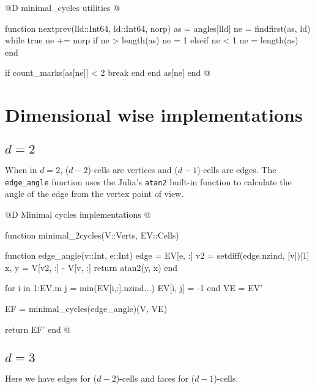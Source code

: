@D minimal\_cycles utilities
@{function nextprev(lld::Int64, ld::Int64, norp)
    as = angles[lld]
    ne = findfirst(as, ld)
    while true
        ne += norp
        if ne > length(as)
            ne = 1
        elseif ne < 1
            ne = length(as)
        end

        if count_marks[as[ne]] < 2
            break
        end
    end
    as[ne]
end
@}



\section{Dimensional wise implementations}
\label{sec:angles_fn}

\subsection{$d=2$}

When in $d=2$, ($d-2$)-cells are vertices and ($d-1$)-cells are edges.
The \texttt{edge\_angle} function uses the Julia's \texttt{atan2} 
built-in function to calculate the angle of the edge from the vertex point of view.

@D Minimal cycles implementations
@{function minimal_2cycles(V::Verts, EV::Cells)

    function edge_angle(v::Int, e::Int)
        edge = EV[e, :]
        v2 = setdiff(edge.nzind, [v])[1]
        x, y = V[v2, :] - V[v, :]
        return atan2(y, x)
    end

    for i in 1:EV.m
        j = min(EV[i,:].nzind...)
        EV[i, j] = -1
    end
    VE = EV'

    EF = minimal_cycles(edge_angle)(V, VE)

    return EF'
end
@}


\subsection{$d=3$}

Here we have edges for ($d-2$)-cells and faces for ($d-1$)-cells.

